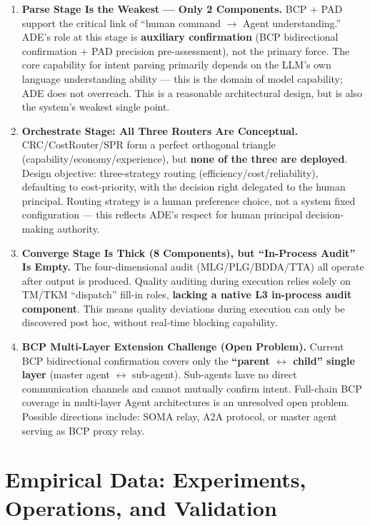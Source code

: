\documentclass[11pt,a4paper]{article}
\begin{document}
\begin{enumerate}
\item \textbf{Parse Stage Is the Weakest --- Only 2 Components.} BCP + PAD support the critical link of ``human command $\rightarrow$ Agent understanding.'' ADE's role at this stage is \textbf{auxiliary confirmation} (BCP bidirectional confirmation + PAD precision pre-assessment), not the primary force. The core capability for intent parsing primarily depends on the LLM's own language understanding ability --- this is the domain of model capability; ADE does not overreach. This is a reasonable architectural design, but is also the system's weakest single point.

\item \textbf{Orchestrate Stage: All Three Routers Are Conceptual.} CRC/CostRouter/SPR form a perfect orthogonal triangle (capability/economy/experience), but \textbf{none of the three are deployed}. Design objective: three-strategy routing (efficiency/cost/reliability), defaulting to cost-priority, with the decision right delegated to the human principal. Routing strategy is a human preference choice, not a system fixed configuration --- this reflects ADE's respect for human principal decision-making authority.

\item \textbf{Converge Stage Is Thick (8 Components), but ``In-Process Audit'' Is Empty.} The four-dimensional audit (MLG/PLG/BDDA/TTA) all operate after output is produced. Quality auditing during execution relies solely on TM/TKM ``dispatch'' fill-in roles, \textbf{lacking a native L3 in-process audit component}. This means quality deviations during execution can only be discovered post hoc, without real-time blocking capability.

\item \textbf{BCP Multi-Layer Extension Challenge (Open Problem).} Current BCP bidirectional confirmation covers only the \textbf{``parent $\leftrightarrow$ child'' single layer} (master agent $\leftrightarrow$ sub-agent). Sub-agents have no direct communication channels and cannot mutually confirm intent. Full-chain BCP coverage in multi-layer Agent architectures is an unresolved open problem. Possible directions include: SOMA relay, A2A protocol, or master agent serving as BCP proxy relay.
\end{enumerate}

\section{Empirical Data: Experiments, Operations, and Validation}
\label{sec:11}
\end{document}
